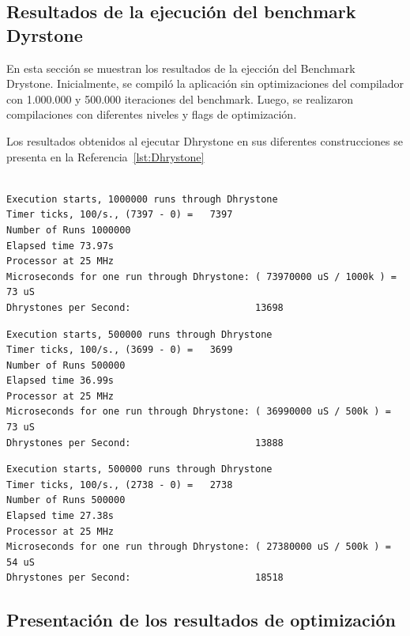 \newpage

		\subsection{Resultados de la ejecución del benchmark Dyrstone}

		En esta sección se muestran los resultados de la ejección del Benchmark Drystone. Inicialmente, se compiló la aplicación sin optimizaciones del
		compilador con 1.000.000 y 500.000 iteraciones del benchmark. Luego, se realizaron compilaciones con diferentes niveles y flags de optimización. 

		Los resultados obtenidos al ejecutar Dhrystone en sus diferentes construcciones se presenta en la Referencia~\ref{lst:Dhrystone}

\begin{lstlisting}[frame=single,caption={Sin optimizaciones },label={lst:Dhrystone},breaklines]

Execution starts, 1000000 runs through Dhrystone
Timer ticks, 100/s., (7397 - 0) =	7397
Number of Runs 1000000
Elapsed time 73.97s
Processor at 25 MHz
Microseconds for one run through Dhrystone: ( 73970000 uS / 1000k ) = 73 uS
Dhrystones per Second:                      13698 
\end{lstlisting}

\begin{lstlisting}[frame=single,caption={Optimización nivel -O2},label={lst:salidas},breaklines]
Execution starts, 500000 runs through Dhrystone
Timer ticks, 100/s., (3699 - 0) =	3699
Number of Runs 500000
Elapsed time 36.99s
Processor at 25 MHz
Microseconds for one run through Dhrystone: ( 36990000 uS / 500k ) = 73 uS
Dhrystones per Second:                      13888 
\end{lstlisting}

\begin{lstlisting}[frame=single,caption={Optimización nivel -O3},label={lst:salidas},breaklines]
Execution starts, 500000 runs through Dhrystone
Timer ticks, 100/s., (2738 - 0) =	2738
Number of Runs 500000
Elapsed time 27.38s
Processor at 25 MHz
Microseconds for one run through Dhrystone: ( 27380000 uS / 500k ) = 54 uS
Dhrystones per Second:                      18518 
\end{lstlisting}


	\subsection {Presentación de los resultados de optimización} 

